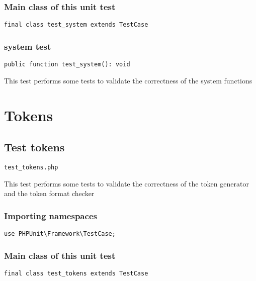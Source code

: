 \documentclass[a4paper]{article}
\begin{document}
\subsubsection{Main class of this unit test}

\begin{lstlisting}
final class test_system extends TestCase
\end{lstlisting}

\hypertarget{toc388}{}
\subsubsection{system test}

\begin{lstlisting}
public function test_system(): void
\end{lstlisting}

This test performs some tests to validate the correctness
of the system functions


\hypertarget{toc389}{}
\section{Tokens}

\hypertarget{toc390}{}
\subsection{Test tokens}

\begin{lstlisting}
test_tokens.php
\end{lstlisting}

This test performs some tests to validate the correctness
of the token generator and the token format checker

\hypertarget{toc391}{}
\subsubsection{Importing namespaces}

\begin{lstlisting}
use PHPUnit\Framework\TestCase;
\end{lstlisting}

\hypertarget{toc392}{}
\subsubsection{Main class of this unit test}

\begin{lstlisting}
final class test_tokens extends TestCase
\end{lstlisting}
\end{document}
